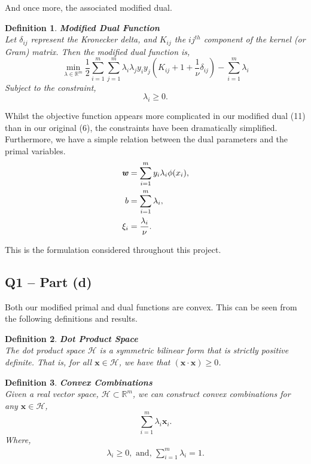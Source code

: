 \documentclass{article}
\newtheorem{definition}{Definition}[section]
\begin{document}
And once more, the associated modified dual. 
\begin{definition} \textbf{Modified Dual Function} \cite{scholkopf2002learning:ch10} \\
Let $\delta_{ij}$ represent the Kronecker delta, and $K_{ij}$ the $ij^{th}$ component of the kernel (or Gram) matrix. Then the modified dual function is,
\begin{equation}
    \min_{\lambda \in \mathbb{R}^m} {\frac{1}{2}} \sum_{i=1}^{m} \sum_{j=1}^{m} \lambda_{i} \lambda_{j} y_{i} y_{j} (K_{ij} + 1 + \frac{1}{\nu} \delta_{ij}) - \sum_{i=1}^{m} \lambda_{i}
\end{equation}
Subject to the constraint,
\begin{equation}
    \lambda_{i} \geq 0.
\end{equation}
\end{definition}

Whilst the objective function appears more complicated in our modified dual (11) than in our original (6), the constraints have been dramatically simplified. Furthermore, we have a simple relation between the dual parameters and the primal variables.
\begin{align}
    \textbf{\textit{w}} &= \sum_{i=1}^{m} y_{i} \lambda_{i} \phi(x_{i}), \\
    b &= \sum_{i=1}^{m} \lambda_{i}, \\
    \xi_{i} &= \frac{\lambda_{i}}{\nu}.
\end{align}


This is the formulation considered throughout this project.

\subsection*{Q1 – Part (d)}
Both our modified primal and dual functions are convex. This can be seen from the following definitions and results. \par

\begin{definition} \textbf{Dot Product Space} \cite{scholkopf2002learning:appendix} \\
The dot product space $\mathcal{H}$ is a symmetric bilinear form that is strictly positive definite. That is, for all $\textbf{x} \in \mathcal{H}$, we have that $(\textbf{x} \cdot \textbf{x}) \geq 0$. 
\end{definition}

\begin{definition} \textbf{Convex Combinations} \cite{scholkopf2002learning:appendix} \\
Given a real vector space, $\mathcal{H} \subset \mathbb{R}^{m}$, we can construct convex combinations for any $\textbf{x} \in \mathcal{H}$,
\begin{equation}
    \sum_{i=1}^{m} \lambda_{i} \textbf{x}_{i}.
\end{equation}
Where, 
\begin{align}
    \lambda_{i} \geq 0, \text{ and, }
    \sum_{i=1}^{m} \lambda_{i} = 1.
\end{align}
\end{definition}
\end{document}
